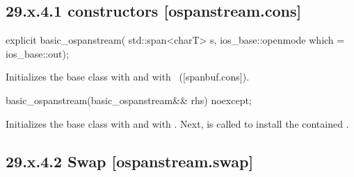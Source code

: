 \documentclass[ebook,11pt,article]{memoir}
\renewcommand{\iref}[1]{[#1]}
\begin{document}

\subsection{29.x.4.1  constructors [ospanstream.cons]}
\label{ospanstream.cons}

\begin{itemdecl}
explicit basic_ospanstream(
  std::span<charT> s,
  ios_base::openmode which = ios_base::out);
\end{itemdecl}

\begin{itemdescr}
\pnum
\effects
Initializes the base class with
and  with
~(\iref{spanbuf.cons}).
\end{itemdescr}

\begin{itemdecl}
basic_ospanstream(basic_ospanstream&& rhs) noexcept;
\end{itemdecl}

\begin{itemdescr}
\pnum
\effects 
Initializes the base class with  
and  with .
Next,  is called to
install the contained .
\end{itemdescr}

\subsection{29.x.4.2 Swap [ospanstream.swap]}
\label{ospanstream.swap}
\end{document}
